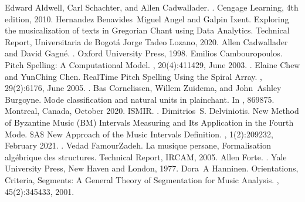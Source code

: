\documentclass[letterpaper,10pt,english]{sphinxmanual}
\begin{document}
\begin{sphinxthebibliography}{10}
Edward Aldwell, Carl Schachter, and Allen Cadwallader. . Cengage Learning, 4th edition, 2010.
Hernandez Benavides Miguel Angel and Galpin Ixent. Exploring the musicalization of texts in Gregorian Chant using Data Analytics. Technical Report, Universitaria de Bogotá Jorge Tadeo Lozano, 2020.
Allen Cadwallader and David Gagné. . Oxford University Press, 1998.
Emilios Cambouropoulos. Pitch Spelling: A Computational Model. , 20(4):411\textendash{}429, June 2003. .
Elaine Chew and Yun\sphinxhyphen{}Ching Chen. Real\sphinxhyphen{}Time Pitch Spelling Using the Spiral Array. , 29(2):61\textendash{}76, June 2005. .
Bas Cornelissen, Willem Zuidema, and John Ashley Burgoyne. Mode classification and natural units in plainchant. In , 869\textendash{}875. Montreal, Canada, October 2020. ISMIR. .
Dimitrios S. Delviniotis. New Method of Byzantine Music (BM) Intervals\textquotesingle{} Measuring and Its Application in the Fourth Mode. \$A\$ New Approach of the Music Intervals\textquotesingle{} Definition. , 1(2):209\textendash{}232, February 2021. .
Vedad FamourZadeh. La musique persane, Formalisation algébrique des structures. Technical Report, IRCAM, 2005.
Allen Forte. . Yale University Press, New Haven and London, 1977.
Dora A Hanninen. Orientations, Criteria, Segments: A General Theory of Segmentation for Music Analysis. , 45(2):345\textendash{}433, 2001.

\end{sphinxthebibliography}
\end{document}
